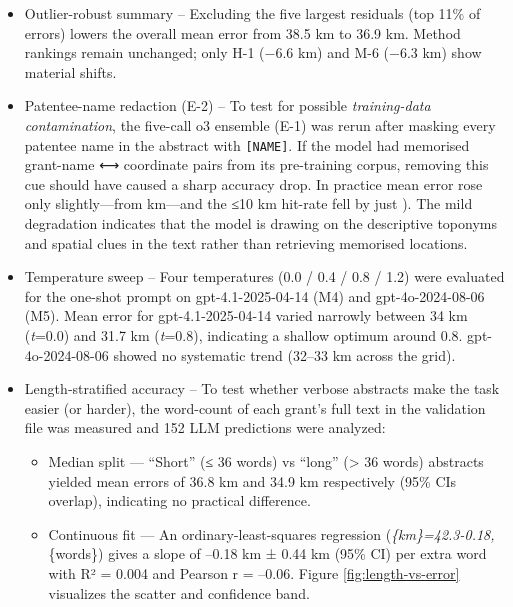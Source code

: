 \begin{itemize}
\item
  Outlier-robust summary -- Excluding the five largest residuals (top
  11\% of errors) lowers the overall mean error from 38.5 km to 36.9 km.
  Method rankings remain unchanged; only H-1 \citep{Bashorun2025_gis}
  (−6.6 km) and M-6 (−6.3 km) show material shifts.
\item
  Patentee-name redaction (E-2) -- To test for possible
  \emph{training-data contamination}, the five-call o3 ensemble (E-1)
  was rerun after masking every patentee name in the abstract with
  \passthrough{\lstinline![NAME]!}. If the model had memorised
  grant-name ⟷ coordinate pairs from its pre-training corpus, removing
  this cue should have caused a sharp accuracy drop. In practice mean
  error rose only slightly---from \DIFdelbegin {}\DIFdelend \DIFaddbegin {}\DIFaddend km---and the ≤10 km
  hit-rate fell by just \DIFdelbegin {}\DIFdelend \DIFaddbegin {} \DIFaddbegin {}\DIFaddend ). The mild degradation
  indicates that the model is drawing on the descriptive toponyms and
  spatial clues in the text rather than retrieving memorised locations.
\item
  Temperature sweep -- Four temperatures (0.0 / 0.4 / 0.8 / 1.2) were
  evaluated for the one-shot prompt on gpt-4.1-2025-04-14 (M4) and
  gpt-4o-2024-08-06 (M5). Mean error for gpt-4.1-2025-04-14 varied
  narrowly between 34 km (\emph{t}=0.0) and 31.7 km (\emph{t}=0.8),
  indicating a shallow optimum around 0.8. gpt-4o-2024-08-06 showed no
  systematic trend (32--33 km across the grid).
\item
  Length‐stratified accuracy -- To test whether verbose abstracts make
  the task easier (or harder), the word-count of each grant's full text
  in the validation file was measured and 152 LLM predictions were
  analyzed:

  \begin{itemize}
  \tightlist
  \item
    Median split --- ``Short'' (≤ 36 words) vs ``long'' (\textgreater{}
    36 words) abstracts yielded mean errors of 36.8 km and 34.9 km
    respectively (95\% CIs overlap), indicating no practical
    difference.\\
  \item
    Continuous fit --- An ordinary-least-squares regression
    (\emph{\{km\}=42.3-0.18,}\{words\}) gives a
    slope of --0.18 km ± 0.44 km (95\% CI) per extra word with R² =
    0.004 and Pearson r = --0.06. Figure \ref{fig:length-vs-error}
    visualizes the scatter and confidence band.
  \end{itemize}
\end{itemize}

